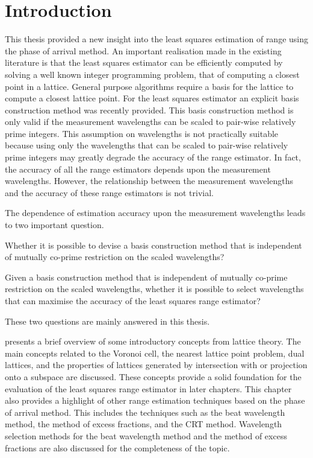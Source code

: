 \label{Chapter6}

\section{Introduction}
This thesis provided a new insight into the least squares estimation of range using the phase of arrival method. An important realisation made in the existing literature is that the least squares estimator can be efficiently computed by solving a well known integer programming problem, that of computing a closest point in a lattice. General purpose algorithms require a basis for the lattice to compute a closest lattice point. For the least squares estimator an explicit basis construction method was recently provided. This basis construction method is only valid if the measurement wavelengths can be scaled to pair-wise relatively prime integers. This assumption on wavelengths is not practically suitable because using only the wavelengths that can be scaled to pair-wise relatively prime integers may greatly degrade the accuracy of the range estimator. In fact, the accuracy of all the range estimators depends upon the measurement wavelengths. However, the relationship between the measurement wavelengths and the accuracy of these range estimators is not trivial.

The dependence of estimation accuracy upon the measurement wavelengths leads to two important question.
\begin{itemise}
\item{Whether it is possible to devise a basis construction method that is independent of mutually co-prime restriction on the scaled wavelengths?}
\item{Given a basis construction method that is  independent of mutually co-prime restriction on the scaled wavelengths, whether it is possible to select wavelengths that can maximise the accuracy of the least squares range estimator?}
\end{itemise}

These two questions are mainly answered in this thesis.

 presents a brief overview of some introductory concepts from lattice theory. The main concepts related to the Voronoi cell, the nearest lattice point problem, dual lattices, and the properties of lattices generated by intersection with or projection onto a subspace are discussed. These concepts provide a solid foundation for the evaluation of the least squares range estimator in later chapters. This chapter also provides a highlight of other range estimation techniques based on the phase of arrival method. This includes the techniques such as the beat wavelength method, the method of excess fractions, and the CRT method. Wavelength selection methods for the beat wavelength method and the method of excess fractions are also discussed for the completeness of the topic.

